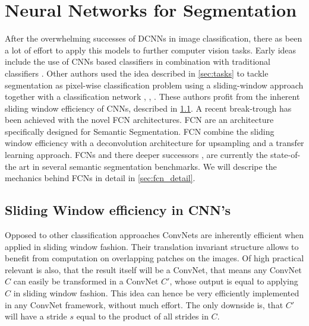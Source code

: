 
\section{Neural Networks for Segmentation}\label{sec:fcn}

After the overwhelming successes of \Glspl{DCNN} in image classification, there as been a lot of effort to apply this models to further computer vision tasks. Early ideas include the use of \Glspl{CNN} based classifiers in combination with traditional classifiers \cite{RNN}. Other authors used the idea described in \cref{sec:tasks} to tackle segmentation as pixel-wise classification problem using a sliding-window approach together with a classification network \cite{fast_scanning}, \cite{overfeat}, \cite{bktt} \cite{highly}. These authors profit from the inherent sliding window efficiency of \Glspl{CNN}, described in \cref{sec:convnet}. A recent break-trough has been achieved with the novel \gls{FCN} \cite{fcn} architectures. \Gls{FCN} are an architecture specifically designed for Semantic Segmentation. \Gls{FCN} combine the sliding window efficiency with a deconvolution architecture for upsampling and a transfer learning approach. \glspl{FCN} and there deeper successors \cite{CRF1}, \cite{deconv1} \cite{googleSeg} are currently the state-of-the art in several semantic segmentation benchmarks. We will descripe the mechanics behind \glspl{FCN} in detail in \cref{sec:fcn_detail}.


\iffalse

As described in \Cref{sec:tasks} Semantic Segmentation can be views as a spatial version of classification, where a classification model can be transferred into a segmentation model using a sliding window approach. In \glspl{CNN} sliding window can be carried out very efficiently. Most CNN based segmentation approaches are using this insight to build models on the shoulders of AlexNet and its deeper successors. 

\fi

\subsection{Sliding Window efficiency in CNN's} \label{sec:convnet}

Opposed to other classification approaches ConvNets are inherently efficient when applied in sliding window fashion. Their translation invariant structure allows to benefit from computation on overlapping patches on the images. Of high practical relevant is also, that the result itself will be a ConvNet, that means any ConvNet $C$ can easily be transformed in a ConvNet $C'$, whose output is equal to applying $C$ in sliding window fashion. This idea can hence be very efficiently implemented in any ConvNet framework, without much effort. The only downside is, that $C'$ will have a stride $s$ equal to the product of all strides in $C$.

